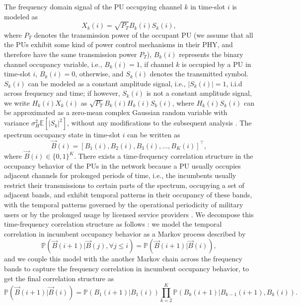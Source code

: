 The frequency domain signal of the PU occupying channel $k$ in time-slot $i$ is modeled as
\begin{equation}\label{3}
    X_{k}(i)=\sqrt{P_{T}}B_{k}(i)S_{k}(i),
\end{equation}
where $P_{T}$ denotes the transmission power of the occupant PU (we assume that all the PUs exhibit some kind of power control mechanisms in their PHY, and therefore have the same transmission power $P_{T}$), $B_{k}(i)$ represents the binary channel occupancy variable, i.e., $B_{k}(i){=}1$, if channel $k$ is occupied by a PU in time-slot $i$, $B_{k}(i){=}0$, otherwise, and $S_{k}(i)$ denotes the transmitted symbol. $S_{k}(i)$ can be modeled as a constant amplitude signal, i.e., $|S_{k}(i)|{=}1$, i.i.d across frequency and time; if however, $S_{k}(i)$ is not a constant amplitude signal, we write $H_{k}(i)X_{k}(i)$ as $\sqrt{P_{T}}B_{k}(i)H_{k}(i)S_{k}(i)$, where $H_{k}(i)S_{k}(i)$ can be approximated as a zero-mean complex Gaussian random variable with variance $\sigma_{H}^{2}\mathbb{E}[|S_{k}|^{2}]$, without any modifications to the subsequent analysis \cite{WCL:paper}. The spectrum occupancy state in time-slot $i$ can be written as
\begin{equation}\label{4}
    \vec{B}(i)=[B_{1}(i),B_{2}(i),B_{3}(i),\dots,B_{K}(i)]^{\intercal},
\end{equation}
where $\vec{B}(i){\in}\{0,1\}^{K}$. There exists a time-frequency correlation structure in the occupancy behavior of the PUs in the network because a PU usually occupies adjacent channels for prolonged periods of time, i.e., the incumbents usually restrict their transmissions to certain parts of the spectrum, occupying a set of adjacent bands, and exhibit temporal patterns in their occupancy of these bands, with the temporal patterns governed by the operational periodicity of military users or by the prolonged usage by licensed service providers \cite{WCL:12}. We decompose this time-frequency correlation structure as follows \cite{WCL:paper}: we model the temporal correlation in incumbent occupancy behavior as a Markov process described by
\begin{equation}\label{5}
    \mathbb{P}(\vec{B}(i+1)|\vec{B}(j),\forall j \leq i)=\mathbb{P}(\vec{B}(i+1)|\vec{B}(i)),
\end{equation}
and we couple this model with the another Markov chain across the frequency bands to capture the frequency correlation in incumbent occupancy behavior, to get the final correlation structure as
\begin{equation}\label{6}
    \mathbb{P}(\vec{B}(i+1)|\vec{B}(i))=\mathbb{P}(B_{1}(i+1)|B_{1}(i))\prod_{k=2}^{K}\mathbb{P}(B_{k}(i+1)|B_{k-1}(i+1),B_{k}(i)).
\end{equation}
